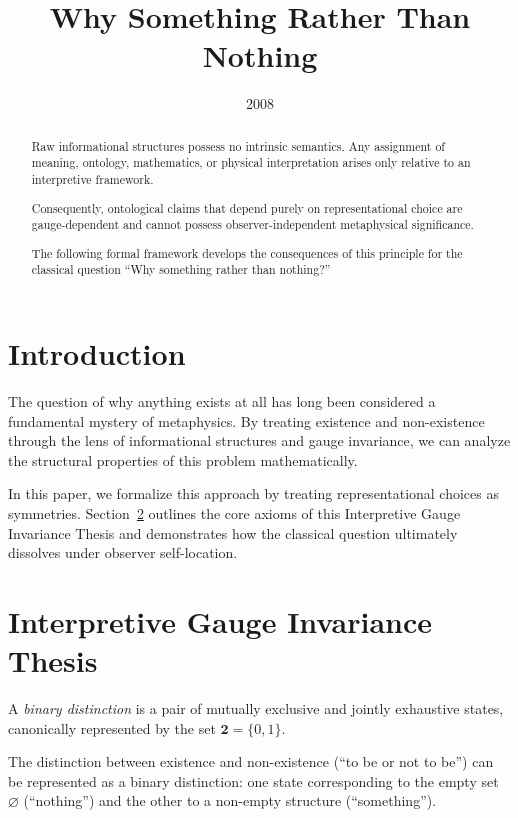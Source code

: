 \documentclass[11pt]{article}
\title{Why Something Rather Than Nothing}
\date{2008}
\begin{document}
\maketitle

\begin{abstract}
Raw informational structures possess no intrinsic semantics.
Any assignment of meaning, ontology, mathematics, or physical
interpretation arises only relative to an interpretive framework.

Consequently, ontological claims that depend purely on representational
choice are gauge-dependent and cannot possess observer-independent
metaphysical significance.

The following formal framework develops the consequences of this principle
for the classical question ``Why something rather than nothing?''
\end{abstract}


\section{Introduction}

The question of why anything exists at all has long been considered a fundamental mystery of metaphysics. By treating existence and non-existence through the lens of informational structures and gauge invariance, we can analyze the structural properties of this problem mathematically. 

In this paper, we formalize this approach by treating representational choices as symmetries. Section~\ref{sec:igit} outlines the core axioms of this Interpretive Gauge Invariance Thesis and demonstrates how the classical question ultimately dissolves under observer self-location.

\section{Interpretive Gauge Invariance Thesis}
\label{sec:igit}

\begin{definition}
A \emph{binary distinction} is a pair of mutually exclusive and jointly exhaustive states, canonically represented by the set $\mathbf{2} = \{0, 1\}$.
\end{definition}

\begin{axiom}
The distinction between existence and non-existence (``to be or not to be'') can be represented as a binary distinction: one state corresponding to the empty set $\varnothing$ (``nothing'') and the other to a non-empty structure (``something'').
\end{axiom}
\end{document}
